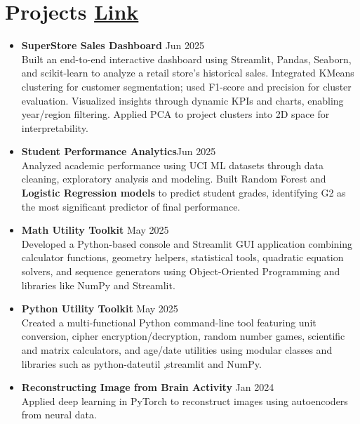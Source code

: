 \documentclass[10 pt, letterpaper]{article}
\begin{document}
\section*{Projects \textbar \href{https://github.com/Seetharamanrs?tab=repositories} {Link}}
\begin{itemize}
 \item \textbf{SuperStore Sales Dashboard } \hfill{Jun 2025} \\Built an end-to-end interactive dashboard using Streamlit, Pandas, Seaborn, and scikit-learn to analyze a retail store’s historical sales. Integrated KMeans clustering for customer segmentation; used F1-score and precision for cluster evaluation. Visualized insights through dynamic KPIs and charts, enabling year/region filtering. Applied PCA to project clusters into 2D space for interpretability.

    \vspace{-0.15cm}
     \item \textbf{Student Performance Analytics}\hfill{Jun 2025} \\Analyzed academic performance using UCI ML datasets through data cleaning, exploratory analysis and modeling. Built Random Forest and \textbf{Logistic Regression models} to predict student grades, identifying G2 as the most significant predictor of final performance.

    \vspace{-0.15cm}
    \item\textbf{Math Utility Toolkit }\hfill{ May 2025}\\ Developed a Python-based console and Streamlit GUI application combining calculator functions, geometry helpers, statistical tools, quadratic equation solvers, and sequence generators using Object-Oriented Programming and libraries like {NumPy} and {Streamlit}.
   \vspace{-0.15cm}
    \item\textbf{Python Utility Toolkit}\hfill{ May 2025}\\ Created a multi-functional Python command-line tool featuring unit conversion, cipher encryption/decryption, random number games, scientific and matrix calculators, and age/date utilities using modular classes and libraries such as {python-dateutil} ,{streamlit} and  {NumPy}.    
   \vspace{-0.15cm}
    \item \textbf{Reconstructing Image from Brain Activity}\hfill{ Jan 2024}\\Applied deep learning in PyTorch to reconstruct images using autoencoders from neural data.


\end{itemize}
\end{document}
